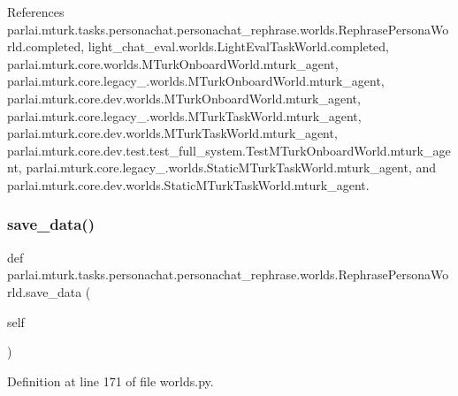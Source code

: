 References parlai.\+mturk.\+tasks.\+personachat.\+personachat\+\_\+rephrase.\+worlds.\+Rephrase\+Persona\+World.\+completed, light\+\_\+chat\+\_\+eval.\+worlds.\+Light\+Eval\+Task\+World.\+completed, parlai.\+mturk.\+core.\+worlds.\+M\+Turk\+Onboard\+World.\+mturk\+\_\+agent, parlai.\+mturk.\+core.\+legacy\+\_.\+worlds.\+M\+Turk\+Onboard\+World.\+mturk\+\_\+agent, parlai.\+mturk.\+core.\+dev.\+worlds.\+M\+Turk\+Onboard\+World.\+mturk\+\_\+agent, parlai.\+mturk.\+core.\+legacy\+\_.\+worlds.\+M\+Turk\+Task\+World.\+mturk\+\_\+agent, parlai.\+mturk.\+core.\+dev.\+worlds.\+M\+Turk\+Task\+World.\+mturk\+\_\+agent, parlai.\+mturk.\+core.\+dev.\+test.\+test\+\_\+full\+\_\+system.\+Test\+M\+Turk\+Onboard\+World.\+mturk\+\_\+agent, parlai.\+mturk.\+core.\+legacy\+\_.\+worlds.\+Static\+M\+Turk\+Task\+World.\+mturk\+\_\+agent, and parlai.\+mturk.\+core.\+dev.\+worlds.\+Static\+M\+Turk\+Task\+World.\+mturk\+\_\+agent.

\mbox{\label{classparlai_1_1mturk_1_1tasks_1_1personachat_1_1personachat__rephrase_1_1worlds_1_1RephrasePersonaWorld_ae86cecd0a95976424b21edf2caa528af}} 
\subsubsection{\texorpdfstring{save\+\_\+data()}{save\_data()}}
{\footnotesize\ttfamily def parlai.\+mturk.\+tasks.\+personachat.\+personachat\+\_\+rephrase.\+worlds.\+Rephrase\+Persona\+World.\+save\+\_\+data (\begin{DoxyParamCaption}\item[{}]{self }\end{DoxyParamCaption})}



Definition at line 171 of file worlds.\+py.



